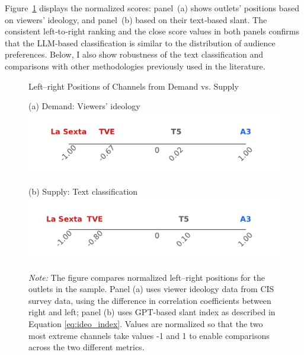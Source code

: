 \documentclass[12pt]{article}
\begin{document}
 
 Figure~\ref{fig:channel_ideology_lines} displays the normalized scores: panel~(a) shows outlets' positions based on viewers’ ideology, and panel~(b) based on their text‐based slant. The consistent left‐to‐right ranking and the close score values in both panels confirms that the LLM‐based classification is similar to  the distribution of audience preferences. Below, I also show robustness of the text classification and comparisons with other methodologies previously used in the literature.
		
	
	
		\begin{figure}[!htbp]
		\centering
		\caption{Left–right Positions of Channels from Demand vs. Supply}

		\begin{minipage}[t]{0.49\textwidth}
			\centering
					(a) Demand: Viewers' ideology
		\includegraphics[width=\linewidth]{figures/congress_line_cis}
		\end{minipage}
		\hfill
		\begin{minipage}[t]{0.49\textwidth}
			\centering

			
				(b) Supply: Text classification
			\includegraphics[width=\linewidth]{figures/congress_line_chatgpt}
			
			
		\end{minipage}
		
		
		\caption*{\small \textit{Note:} The figure compares normalized left–right positions for the outlets in the sample. Panel (a) uses viewer ideology data from CIS survey data, using the difference in correlation coefficients between right and left; panel (b) uses GPT-based slant index as described in Equation \eqref{eq:ideo_index}. Values are normalized so that the two most extreme channels take values -1 and 1 to enable comparisons across the two different metrics. }
		\label{fig:channel_ideology_lines}
	\end{figure}
	
\end{document}
